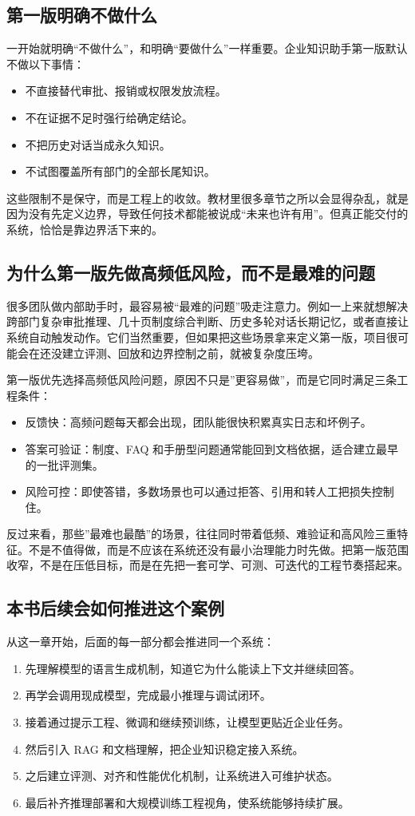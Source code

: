 \subsection{第一版明确不做什么}
一开始就明确“不做什么”，和明确“要做什么”一样重要。企业知识助手第一版默认不做以下事情：
\begin{itemize}
  \item 不直接替代审批、报销或权限发放流程。
  \item 不在证据不足时强行给确定结论。
  \item 不把历史对话当成永久知识。
  \item 不试图覆盖所有部门的全部长尾知识。
\end{itemize}

这些限制不是保守，而是工程上的收敛。教材里很多章节之所以会显得杂乱，就是因为没有先定义边界，导致任何技术都能被说成“未来也许有用”。但真正能交付的系统，恰恰是靠边界活下来的。

\subsection{为什么第一版先做高频低风险，而不是最难的问题}
很多团队做内部助手时，最容易被“最难的问题”吸走注意力。例如一上来就想解决跨部门复杂审批推理、几十页制度综合判断、历史多轮对话长期记忆，或者直接让系统自动触发动作。它们当然重要，但如果把这些场景拿来定义第一版，项目很可能会在还没建立评测、回放和边界控制之前，就被复杂度压垮。

第一版优先选择高频低风险问题，原因不只是”更容易做”，而是它同时满足三条工程条件：
\begin{itemize}
  \item 反馈快：高频问题每天都会出现，团队能很快积累真实日志和坏例子。
  \item 答案可验证：制度、FAQ 和手册型问题通常能回到文档依据，适合建立最早的一批评测集。
  \item 风险可控：即使答错，多数场景也可以通过拒答、引用和转人工把损失控制住。
\end{itemize}

反过来看，那些”最难也最酷”的场景，往往同时带着低频、难验证和高风险三重特征。不是不值得做，而是不应该在系统还没有最小治理能力时先做。把第一版范围收窄，不是在压低目标，而是在先把一套可学、可测、可迭代的工程节奏搭起来。

\subsection{本书后续会如何推进这个案例}
从这一章开始，后面的每一部分都会推进同一个系统：
\begin{enumerate}
  \item 先理解模型的语言生成机制，知道它为什么能读上下文并继续回答。
  \item 再学会调用现成模型，完成最小推理与调试闭环。
  \item 接着通过提示工程、微调和继续预训练，让模型更贴近企业任务。
  \item 然后引入 RAG 和文档理解，把企业知识稳定接入系统。
  \item 之后建立评测、对齐和性能优化机制，让系统进入可维护状态。
  \item 最后补齐推理部署和大规模训练工程视角，使系统能够持续扩展。
\end{enumerate}

